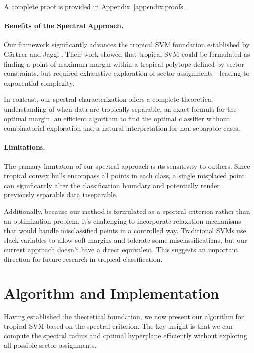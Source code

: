 \documentclass{article}
\begin{document}
A complete proof is provided in Appendix~\ref{appendix:proofs}.

\paragraph{Benefits of the Spectral Approach.} 
Our framework significantly advances the tropical SVM foundation established by Gärtner and Jaggi \cite{gartner2008}. Their work showed that tropical SVM could be formulated as finding a point of maximum margin within a tropical polytope defined by sector constraints, but required exhaustive exploration of sector assignments—leading to exponential complexity.

In contrast, our spectral characterization offers a complete theoretical understanding of when data are tropically separable, an exact formula for the optimal margin, an efficient algorithm to find the optimal classifier without combinatorial exploration and a natural interpretation for non-separable cases.

\paragraph{Limitations.} 
The primary limitation of our spectral approach is its sensitivity to outliers. Since tropical convex hulls encompass all points in each class, a single misplaced point can significantly alter the classification boundary and potentially render previously separable data inseparable.

Additionally, because our method is formulated as a spectral criterion rather than an optimization problem, it's challenging to incorporate relaxation mechanisms that would handle misclassified points in a controlled way. Traditional SVMs use slack variables to allow soft margins and tolerate some misclassifications, but our current approach doesn't have a direct equivalent. This suggests an important direction for future research in tropical classification.

\section{Algorithm and Implementation}\label{sec:algorithm}

Having established the theoretical foundation, we now present our algorithm for tropical SVM based on the spectral criterion. The key insight is that we can compute the spectral radius and optimal hyperplane efficiently without exploring all possible sector assignments.
\end{document}
